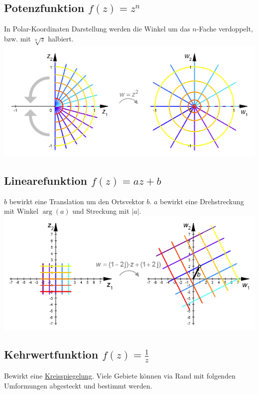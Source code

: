\subsection{Potenzfunktion $f(z) = z^n$}
In Polar-Koordinaten Darstellung werden die Winkel um das $n$-Fache verdoppelt, bzw. mit $\sqrt[n]{z}$ halbiert.
\includegraphics[width=\columnwidth]{Images/quadrat_funktion}

\subsection{Linearefunktion $f(z) = az + b$}
$b$ bewirkt eine Translation um den Ortsvektor $b$. $a$ bewirkt eine Drehstreckung mit Winkel $\arg(a)$ und Streckung mit $|a|$.
\includegraphics[width=\columnwidth]{Images/lineare_funktion}


\subsection{Kehrwertfunktion $f(z) = \frac{1}{z}$}
Bewirkt eine \underline{Kreisspiegelung}. Viele Gebiete können via Rand mit folgenden Umformungen abgesteckt und bestimmt werden.

